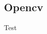 \documentclass[./Vision.tex]{subfiles}
\begin{document}
    \subsection{Opencv}
    Test
\end{document}
